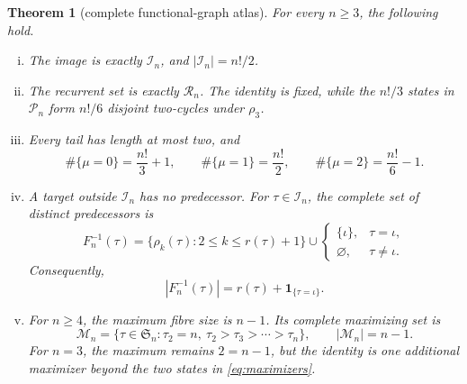 \documentclass[a4paper,10pt]{amsart}
\newtheorem{theorem}{Theorem}
\theoremstyle{remark}
\newcommand{\Sn}{\mathfrak S_n}
\newcommand{\cI}{\mathcal I}
\newcommand{\cM}{\mathcal M}
\newcommand{\cP}{\mathcal P}
\newcommand{\cR}{\mathcal R}
\begin{document}
\begin{theorem}[complete functional-graph atlas]\label{thm:main}
For every $n\ge3$, the following hold.
\begin{enumerate}[(i)]
\item The image is exactly $\cI_n$, and $|\cI_n|=n!/2$.

\item The recurrent set is exactly $\cR_n$.  The identity is fixed, while
the $n!/3$ states in $\cP_n$ form $n!/6$ disjoint two-cycles under $\rho_3$.

\item Every tail has length at most two, and
\begin{equation}\label{eq:tail-census}
 \#\{\mu=0\}=\frac{n!}{3}+1,\qquad
 \#\{\mu=1\}=\frac{n!}{2},\qquad
 \#\{\mu=2\}=\frac{n!}{6}-1.
\end{equation}

\item A target outside $\cI_n$ has no predecessor.  For $\tau\in\cI_n$,
the complete set of distinct predecessors is
\begin{equation}\label{eq:fibre-set}
 F_n^{-1}(\tau)=
 \{\rho_k(\tau):2\le k\le r(\tau)+1\}
 \mathbin{\cup}
 \begin{cases}\{\iota\},&\tau=\iota,\\ \varnothing,&\tau\ne\iota.
 \end{cases}
\end{equation}
Consequently,
\begin{equation}\label{eq:fibre-size}
             |F_n^{-1}(\tau)|=r(\tau)+\mathbf1_{\{\tau=\iota\}}.
\end{equation}

\item For $n\ge4$, the maximum fibre size is $n-1$.  Its complete maximizing
set is
\begin{equation}\label{eq:maximizers}
 \cM_n=\{\tau\in\Sn:\tau_2=n,
              \ \tau_2>\tau_3>\cdots>\tau_n\},
 \qquad |\cM_n|=n-1.
\end{equation}
For $n=3$, the maximum remains $2=n-1$, but the identity is one additional
maximizer beyond the two states in \eqref{eq:maximizers}.
\end{enumerate}
\end{theorem}
\end{document}
